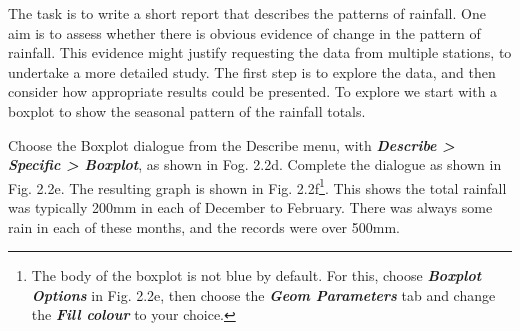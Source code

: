 \documentclass[
  letterpaper,
  DIV=11,
  numbers=noendperiod]{scrreprt}
\begin{document}
The task is to write a short report that describes the patterns of
rainfall. One aim is to assess whether there is obvious evidence of
change in the pattern of rainfall. This evidence might justify
requesting the data from multiple stations, to undertake a more detailed
study. The first step is to explore the data, and then consider how
appropriate results could be presented. To explore we start with a
boxplot to show the seasonal pattern of the rainfall totals.

Choose the Boxplot dialogue from the Describe menu, with
\textbf{\emph{Describe \textgreater{} Specific \textgreater{} Boxplot}},
as shown in Fog. 2.2d. Complete the dialogue as shown in Fig. 2.2e. The
resulting graph is shown in Fig. 2.2f\footnote{The body of the boxplot
  is not blue by default. For this, choose \textbf{\emph{Boxplot
  Options}} in Fig. 2.2e, then choose the \textbf{\emph{Geom
  Parameters}} tab and change the \textbf{\emph{Fill colour}} to your
  choice.}. This shows the total rainfall was typically 200mm in each of
December to February. There was always some rain in each of these
months, and the records were over 500mm.
\end{document}
